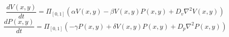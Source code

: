 \documentclass{article}
\begin{document}
\[
\frac{d V(x,y)}{d t} = \Pi_{[0,1]} \left( \alpha V(x,y) - \beta V(x,y) P(x,y) + D_v \nabla^2 V(x,y) \right)
\]
\[
\frac{d P(x,y)}{d t} = \Pi_{[0,1]} \left( - \gamma P(x,y) + \delta V(x,y) P(x,y) + D_p \nabla^2 P(x,y) \right)
\]
\end{document}
